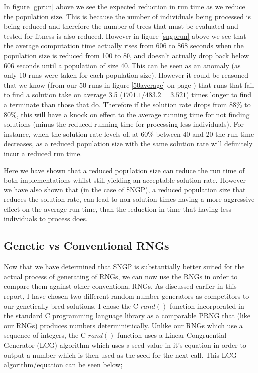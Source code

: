 \documentclass[a4paper,10.5pt]{article}
\begin{document}
In figure \ref{gprun} above we see the expected reduction in run time as we reduce the population size. This is because the number of individuals being processed is being reduced and therefore the number of trees that must be evaluated and tested for fitness is also reduced. However in figure \ref{sngprun} above we see that the average computation time actually rises from 606 to 868 seconds when the population size is reduced from 100 to 80, and doesn't actually drop back below 606 seconds until a population of size 40. This can be seen as an anomaly (as only 10 runs were taken for each population size). However it could be reasoned that we know (from our 50 runs in figure \ref{50average} on page \pageref{50average}) that runs that fail to find a solution take on average 3.5 ($1701.1 / 483.2 = 3.521$) times longer to find a terminate than those that do. Therefore if the solution rate drops from 88\% to 80\%, this will have a knock on effect to the average running time for not finding solutions (minus the reduced running time for processing less individuals). For instance, when the solution rate levels off at 60\% between 40 and 20 the run time decreases, as a reduced population size with the same solution rate will definitely incur a reduced run time.

Here we have shown that a reduced population size can reduce the run time of both implementations whilst still yielding an acceptable solution rate. However we have also shown that (in the case of SNGP), a reduced population size that reduces the solution rate, can lead to non solution times having a more aggressive effect on the average run time, than the reduction in time that having less individuals to process does.

\subsection{Genetic vs Conventional RNGs}

Now that we have determined that SNGP is substantially better suited for the actual process of generating of RNGs, we can now use the RNGs in order to compare them against other conventional RNGs. As discussed earlier in this report, I have chosen two different random number generators as competitors to our genetically bred solutions. I chose the C $rand()$ function incorporated in the standard C programming language library as a comparable PRNG that (like our RNGs) produces numbers deterministically. Unlike our RNGs which use a sequence of integers, the C $rand()$ function uses a Linear Congruential Generator (LCG) algorithm which uses a seed value in it's equation in order to output a number which is then used as the seed for the next call. This LCG algorithm/equation can be seen below;
\end{document}

